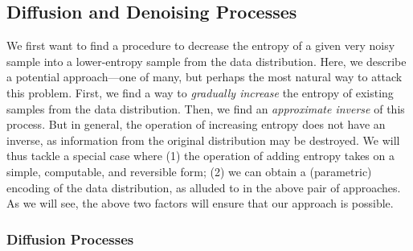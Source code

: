 \documentclass[../../book-main.tex]{subfiles}
\begin{document}
\subsection{Diffusion and Denoising Processes} \label{sub:intro_diffusion_denoising}

We first want to find a procedure to decrease the entropy of a given very noisy sample into a lower-entropy sample from the data distribution. Here, we describe a potential approach—one of many, but perhaps the most natural way to attack this problem. First, we find a way to \textit{gradually increase} the entropy of existing samples from the data distribution. Then, we find an \textit{approximate inverse} of this process. But in general, the operation of increasing entropy does not have an inverse, as information from the original distribution may be destroyed. We will thus tackle a special case where (1) the operation of adding entropy takes on a simple, computable, and reversible form; (2) we can obtain a (parametric) encoding of the data distribution, as alluded to in the above pair of approaches. As we will see, the above two factors will ensure that our approach is possible.

\subsubsection{Diffusion Processes}
\end{document}
